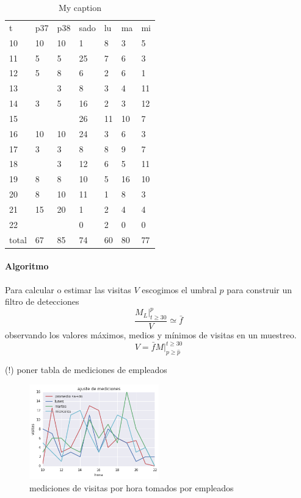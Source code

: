 \begin{table}[]
\centering
\caption{My caption}
\label{my-label}
\begin{tabular}{lllllll}
 t  & p37 & p38 & sado & lu & ma & mi \\
 10 &  10 &  10 &    1 &  8 &  3 &  5\\
 11 &   5 &   5 &   25 &  7 &  6 &  3\\
 12 &   5 &   8 &    6 &  2 &  6 &  1\\
 13 &     &   3 &    8 &  3 &  4 & 11\\
 14 &   3 &   5 &   16 &  2 &  3 & 12\\
 15 &     &     &   26 & 11 & 10 &  7\\
 16 &  10 &  10 &   24 &  3 &  6 &  3\\
 17 &   3 &   3 &    8 &  8 &  9 &  7\\
 18 &     &   3 &   12 &  6 &  5 & 11\\
 19 &   8 &   8 &   10 &  5 & 16 & 10\\
 20 &   8 &  10 &   11 &  1 &  8 &  3\\
 21 &  15 &  20 &    1 &  2 &  4 &  4\\
 22 &     &     &    0 &  2 &  0 &  0\\
 total   & 67 &  85 &        74 & 60 & 80 & 77
\end{tabular}
\end{table}

\paragraph{Algoritmo}
Para calcular o estimar las visitas $V$
escogimos el umbral $p$ para construir un filtro de detecciones
\[
\frac{M_L \Big|_{t\ge 30}^{p}}{V} \simeq \bar{f}
\]
observando los valores máximos, medios y mínimos de visitas en un muestreo.
\[
V = \bar{f} M \Big|^{t \ge 30}_{p \ge \hat{p}}
\]

(!) poner tabla de mediciones de empleados
\begin{figure}[H] 
  \centering
  \includegraphics[width=0.5\textwidth]{mediciones.png}
  \caption{
    mediciones de visitas por hora tomados por empleados
  }
  \label{fig:mediciones}
\end{figure}


